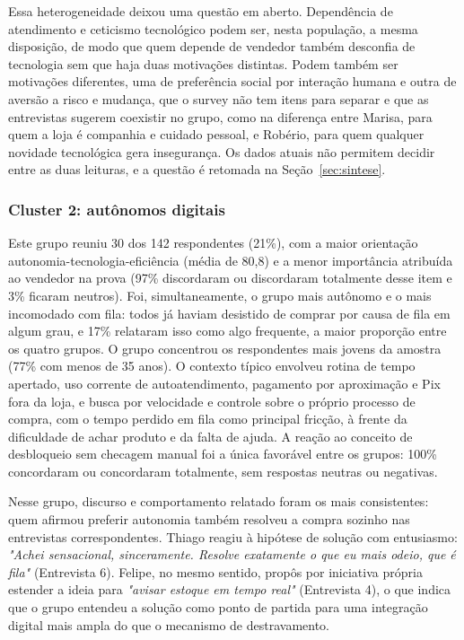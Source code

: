Essa heterogeneidade deixou uma questão em aberto. Dependência de atendimento e ceticismo tecnológico podem ser, nesta população, a mesma disposição, de modo que quem depende de vendedor também desconfia de tecnologia sem que haja duas motivações distintas. Podem também ser motivações diferentes, uma de preferência social por interação humana e outra de aversão a risco e mudança, que o survey não tem itens para separar e que as entrevistas sugerem coexistir no grupo, como na diferença entre Marisa, para quem a loja é companhia e cuidado pessoal, e Robério, para quem qualquer novidade tecnológica gera insegurança. Os dados atuais não permitem decidir entre as duas leituras, e a questão é retomada na Seção~\ref{sec:sintese}.

\subsubsection{Cluster 2: autônomos digitais}

Este grupo reuniu 30 dos 142 respondentes (21\%), com a maior orientação autonomia-tecnologia-eficiência (média de 80,8) e a menor importância atribuída ao vendedor na prova (97\% discordaram ou discordaram totalmente desse item e 3\% ficaram neutros). Foi, simultaneamente, o grupo mais autônomo e o mais incomodado com fila: todos já haviam desistido de comprar por causa de fila em algum grau, e 17\% relataram isso como algo frequente, a maior proporção entre os quatro grupos. O grupo concentrou os respondentes mais jovens da amostra (77\% com menos de 35 anos). O contexto típico envolveu rotina de tempo apertado, uso corrente de autoatendimento, pagamento por aproximação e Pix fora da loja, e busca por velocidade e controle sobre o próprio processo de compra, com o tempo perdido em fila como principal fricção, à frente da dificuldade de achar produto e da falta de ajuda. A reação ao conceito de desbloqueio sem checagem manual foi a única favorável entre os grupos: 100\% concordaram ou concordaram totalmente, sem respostas neutras ou negativas.

Nesse grupo, discurso e comportamento relatado foram os mais consistentes: quem afirmou preferir autonomia também resolveu a compra sozinho nas entrevistas correspondentes. Thiago reagiu à hipótese de solução com entusiasmo: \emph{"Achei sensacional, sinceramente. Resolve exatamente o que eu mais odeio, que é fila"} (Entrevista 6). Felipe, no mesmo sentido, propôs por iniciativa própria estender a ideia para \emph{"avisar estoque em tempo real"} (Entrevista 4), o que indica que o grupo entendeu a solução como ponto de partida para uma integração digital mais ampla do que o mecanismo de destravamento.

